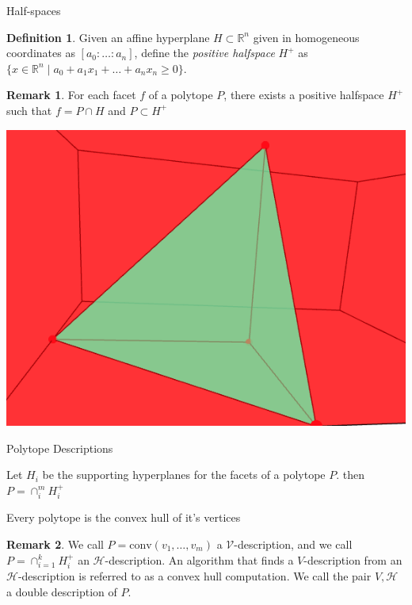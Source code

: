 \documentclass[9pt]{beamer}
\theoremstyle{definition}
\newtheorem{remark}{Remark}
\newtheorem{defn}{Definition}
\begin{document}
\begin{frame}[fragile]{Half-spaces}
  \begin{defn}
    Given an affine hyperplane $H \subset \mathbb{R}^n$ given in homogeneous
    coordinates as $[a_0 : \dots : a_n]$, define the \emph{positive halfspace}
    $H^+$ as $\{x \in \mathbb{R}^n \mid a_0 + a_1x_1 + \dots + a_nx_n \geq 0 \}$.
  \end{defn}

  \begin{remark}
    For each facet $f$ of a polytope $P$, there exists a positive halfspace $H^+$
    such that $f = P \cap H$ and $ P \subset H^+$
  \end{remark}

  \begin{center}
    \includegraphics[width=.30\textwidth, height=0.4\textheight]{images/half-space}
  \end{center}
\end{frame}

\begin{frame}[fragile]{Polytope Descriptions}
  \begin{theorem}
    Let $H_i$ be the supporting hyperplanes for the facets of a polytope $P$.
    then $P = \cap_i^m H_i^+$
  \end{theorem}
  \begin{theorem}
    Every polytope is the convex hull of it's vertices
  \end{theorem}
  \begin{remark}
    We call $P =  \text{conv}(v_1, \dots, v_m)$ a $\mathcal{V}$-description, and
    we call $P =  \cap_{i=1}^kH_i^+$ an $\mathcal{H}$-description. An algorithm
    that finds a $V$-description from an $\mathcal{H}$-description is referred to as a convex
    hull computation. We call the pair ${V, \mathcal{H} }$ a double description of $P$.
  \end{remark}
\end{frame}
\end{document}
